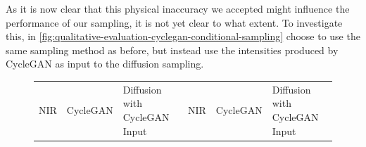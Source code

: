 As it is now clear that this physical inaccuracy we accepted might influence the performance of our sampling, it is not yet clear to what extent.
To investigate this, in \autoref{fig:qualitative-evaluation-cyclegan-conditional-sampling} choose to use the same sampling method as before, but instead use the intensities produced by CycleGAN as input to the diffusion sampling.

\begin{figure}[htp!]
    \centering
    \begin{tabularx}{\textwidth}{>{\centering\arraybackslash}X >{\centering\arraybackslash}X >{\centering\arraybackslash}X >{\centering\arraybackslash}X >{\centering\arraybackslash}X >{\centering\arraybackslash}X}
        NIR                                                                              & CycleGAN                                                                                   & Diffusion with CycleGAN Input                                                                    & NIR                                                                              & CycleGAN                                                                                   & Diffusion with CycleGAN Input                                                                    \\

\end{tabularx}
\end{figure}
